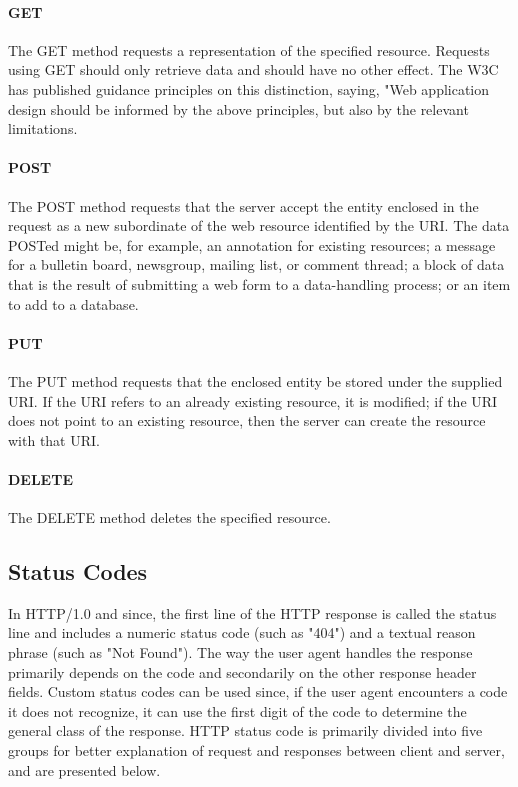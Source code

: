 \paragraph{GET}
The GET method requests a representation of the specified resource. Requests using GET should only retrieve data and should have no other effect. The W3C has published guidance principles on this distinction, saying, "Web application design should be informed by the above principles, but also by the relevant limitations.

\paragraph{POST}
The POST method requests that the server accept the entity enclosed in the request as a new subordinate of the web resource identified by the URI. The data POSTed might be, for example, an annotation for existing resources; a message for a bulletin board, newsgroup, mailing list, or comment thread; a block of data that is the result of submitting a web form to a data-handling process; or an item to add to a database.

\paragraph{PUT}
The PUT method requests that the enclosed entity be stored under the supplied URI. If the URI refers to an already existing resource, it is modified; if the URI does not point to an existing resource, then the server can create the resource with that URI.

\paragraph{DELETE}
The DELETE method deletes the specified resource.




\subsection{Status Codes}
In HTTP/1.0 and since, the first line of the HTTP response is called the status line and includes a numeric status code (such as "404") and a textual reason phrase (such as "Not Found"). The way the user agent handles the response primarily depends on the code and secondarily on the other response header fields. Custom status codes can be used since, if the user agent encounters a code it does not recognize, it can use the first digit of the code to determine the general class of the response. HTTP status code is primarily divided into five groups for better explanation of request and responses between client and server, and are presented below. 

